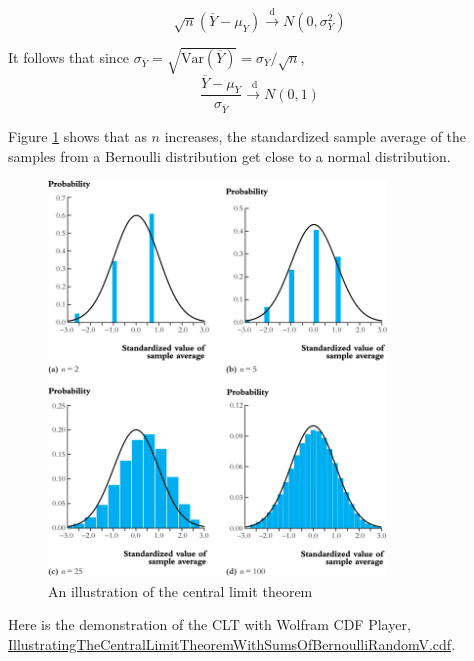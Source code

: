 \documentclass[a4paper,11pt]{article}
\begin{document}
\[ \sqrt{n}(\overline{Y}-\mu_Y) \xrightarrow{\text{d}} N(0,
\sigma^2_Y) \]

It follows that since \(\sigma_{\overline{Y}} =
\sqrt{\mathrm{Var}(\overline{Y})} = \sigma_Y/\sqrt{n}\),
\[ \frac{\overline{Y} - \mu_Y}{\sigma_{\overline{Y}}}
\xrightarrow{\text{ d}} N(0, 1) \]

Figure \ref{fig:orge26d2c3} shows that as \(n\) increases, the standardized sample
average of the samples from a Bernoulli distribution get close to a
normal distribution. 

\begin{figure}[htbp]
\centering
\includegraphics[width=0.8\textwidth]{figure/fig-2-9.png}
\caption{\label{fig:orge26d2c3}
An illustration of the central limit theorem}
\end{figure}

Here is the demonstration of the CLT with Wolfram CDF Player,
\url{IllustratingTheCentralLimitTheoremWithSumsOfBernoulliRandomV.cdf}.
\end{document}
